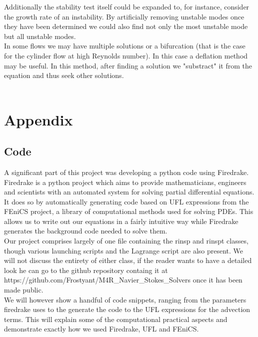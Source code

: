 \documentclass[11pt,twoside,a4paper]{article}
\begin{document}
Additionally the stability test itself could be expanded to, for instance, consider the growth rate of an instability. By artificially removing unstable modes once they have been determined we could also find not only the most unstable mode but all unstable modes.\\
In some flows we may have multiple solutions or a bifurcation (that is the case for the cylinder flow at high Reynolds number). In this case a deflation method may be useful. In this method, after finding a solution we "substract" it from the equation and thus seek other solutions.\\
\\


\section{Appendix}
\subsection{Code}
A significant part of this project was developing a python code using Firedrake.
Firedrake is a python project which aims to provide mathematicians, engineers and scientists with an automated system for solving partial differential equations.\\
It does so by automatically generating code based on UFL expressions from the FEniCS project, a library of computational methods used for solving PDEs. This allows us to write out our equations in a fairly intuitive way while Firedrake generates the background code needed to solve them.\\
Our project comprises largely of one file containing the rinsp and rinspt classes, though various launching scripts and the Lagrange script are also present. We will not discuss the entirety of either class, if the reader wants to have a detailed look he can go to the github repository containg it at https://github.com/Frostyant/M4R\_Navier\_Stokes\_Solvers once it has been made public.\\
We will however show a handful of code snippets, ranging from the parameters firedrake uses to the generate the code to the UFL expressions for the advection terms. This will explain some of the computational practical aspects and demonstrate exactly how we used Firedrake, UFL and FEniCS.
\end{document}
